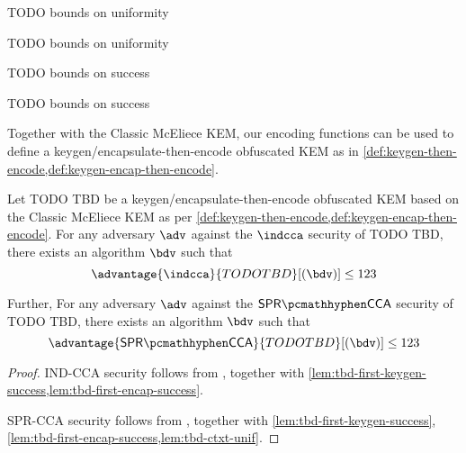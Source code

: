 \begin{lemma} \label{lem:tbd-pk-unif}
    TODO bounds on uniformity
\end{lemma}

\begin{lemma} \label{lem:tbd-ctxt-unif}
    TODO bounds on uniformity
\end{lemma}

\begin{lemma} \label{lem:tbd-first-keygen-success}
    TODO bounds on success
\end{lemma}

\begin{lemma}[[First-encap success probability of TODO TBD] \label{lem:tbd-first-encap-success}
    TODO bounds on success
\end{lemma}

Together with the Classic McEliece KEM, our encoding functions can be used to define a keygen/encapsulate-then-encode obfuscated KEM as in \cref{def:keygen-then-encode,def:keygen-encap-then-encode}.

\begin{theorem}
    Let TODO TBD be a keygen/encapsulate-then-encode obfuscated KEM based on the Classic McEliece KEM as per \cref{def:keygen-then-encode,def:keygen-encap-then-encode}. For any adversary $\adv$ against the $\indcca$ security of TODO TBD, there exists an algorithm $\bdv$ such that
    \[ \advantage{\indcca}{TODO TBD}[(\bdv)] \leq 123 \]

    Further,  For any adversary $\adv$ against the $\sprcca$ security of TODO TBD, there exists an algorithm $\bdv$ such that
    \[ \advantage{\sprcca}{TODO TBD}[(\bdv)] \leq 123 \]
\end{theorem}
\begin{proof}
    IND-CCA security follows from \cite[Theorem~2.12]{CCS:GunSteVei24}, together with \cref{lem:tbd-first-keygen-success,lem:tbd-first-encap-success}.
    
    SPR-CCA security follows from \cite[Theorem~2.13]{CCS:GunSteVei24}, together with \cref{lem:tbd-first-keygen-success}, \ref{lem:tbd-first-encap-success,lem:tbd-ctxt-unif}.
\end{proof}